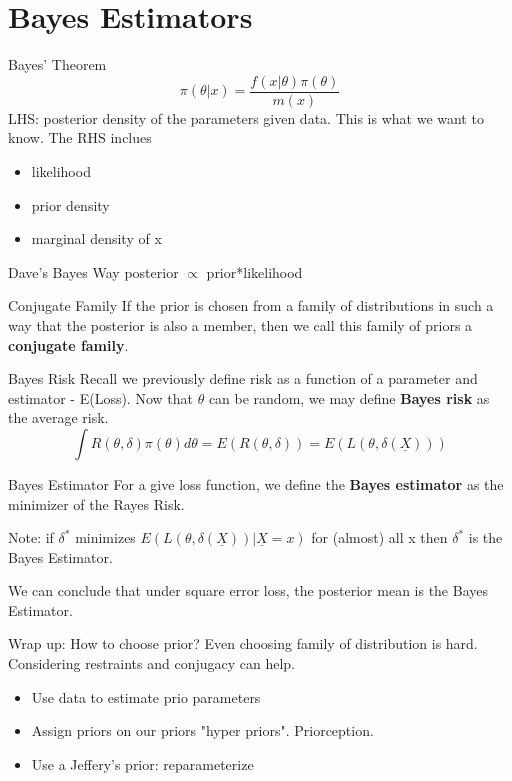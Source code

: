 \documentclass[11pt,fleqn]{book} %
\begin{document}
\section{Bayes Estimators}

\begin{theorem}{Bayes' Theorem}
$$\pi(\theta|x) = \frac{f(x|\theta)\pi(\theta)}{m(x)} $$
LHS: posterior density of the parameters given data. This is what we want to know. The RHS inclues
\begin{itemize}
	\item likelihood
	\item prior density
	\item marginal density of x
\end{itemize}
	
\end{theorem}

\begin{proposition}{Dave's Bayes Way}
 posterior $\propto$ prior*likelihood
\end{proposition}

\begin{definition}{Conjugate Family}
If the prior is chosen from a family of distributions in such a way that the posterior is also a member, then we call this family of priors a \textbf{conjugate family}.
\end{definition}

\begin{definition}{Bayes Risk}
	Recall we previously define risk as a function of a parameter and estimator - E(Loss). Now that $\theta$ can be random, we may define \textbf{Bayes risk} as the average risk.
	$$\int R(\theta,\delta)\pi(\theta) d\theta = E(R(\theta,\delta)) = E(L(\theta,\delta(\underline{X}))) $$
\end{definition}

\begin{definition}{Bayes Estimator}
	For a give loss function, we define the \textbf{Bayes estimator} as the minimizer of the Rayes Risk. 
\end{definition}
Note: if $\delta^*$ minimizes $E(L(\theta,\delta(\underline{X}))|\underline{X}=x)$ for (almost) all x then $\delta^*$ is the Bayes Estimator. 

We can conclude that under square error loss, the posterior mean is the Bayes Estimator. 

Wrap up: How to choose prior? Even choosing family of distribution is hard. Considering restraints and conjugacy can help.
\begin{itemize}
	\item Use data to estimate prio parameters
	\item Assign priors on our priors "hyper priors". Priorception.
	\item Use a Jeffery's prior: reparameterize
\end{itemize}
\end{document}
